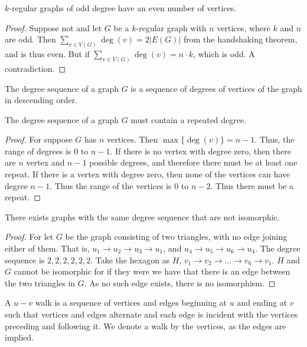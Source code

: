 \documentclass[crop=false,class=book]{standalone}
\begin{document}
\begin{corollary}
$k$-regular graphs of odd degree have an even number of vertices.
\end{corollary}
\begin{proof}
Suppose not and let $G$ be a $k$-regular graph with $n$ vertices, where $k$ and $n$ are odd. Then $\sum_{v\in V(G)}\deg(v) = 2|E(G)|$ from the handshaking theorem, and is thus even. But if $\sum_{v\in V(G)}\deg(v) = n\cdot k$, which is odd. A contradiction.
\end{proof}
\begin{definition}
The degree sequence of a graph $G$ is a sequence of degrees of vertices of the graph in descending order.
\end{definition}
\begin{theorem}
The degree sequence of a graph $G$ must contain a repeated degree.
\end{theorem}
\begin{proof}
For suppose $G$ has $n$ vertices. Then $\max\{\deg(v)\} = n-1$. Thus, the range of degrees is $0$ to $n-1$. If there is no vertex with degree zero, then there are $n$ vertex and $n-1$ possible degrees, and therefore there must be at least one repeat. If there is a vertex with degree zero, then none of the vertices can have degree $n-1$. Thus the range of the vertices is $0$ to $n-2$. Thus there must be a repeat. 
\end{proof}
\begin{theorem}
There exists graphs with the same degree sequence that are not
isomorphic.
\end{theorem}
\begin{proof}
For let $G$ be the graph consisting of two triangles, with no edge joining either of them. That is, $u_1\rightarrow u_2 \rightarrow u_3\rightarrow u_1$, and $u_4\rightarrow u_5 \rightarrow u_6 \rightarrow u_4$. The degree sequence is $2,2,2,2,2,2$. Take the hexagon as $H$, $v_1\rightarrow v_2 \rightarrow \hdots \rightarrow v_6 \rightarrow v_1$. $H$ and $G$ cannot be isomorphic for if they were we have that there is an edge between the two triangles in $G$. As no such edge exists, there is no isomorphism.
\end{proof}
\begin{definition}
A $u-v$ walk is a sequence of vertices and edges beginning at $u$ and ending at $v$ such that vertices and edges alternate and each edge is incident with the vertices preceding and following it. We denote a walk by the vertices, as the edges are implied.
\end{definition}
\end{document}
